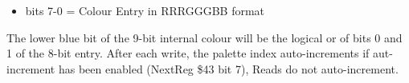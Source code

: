 \begin{itemize}
\item bits 7-0 = Colour Entry in RRRGGGBB format
\end{itemize}
The lower blue bit of the 9-bit internal colour will be the logical or
of bits 0 and 1 of the 8-bit entry. After each write, the palette
index auto-increments if aut-increment has been enabled (NextReg \$43
bit 7), Reads do not auto-increment.

